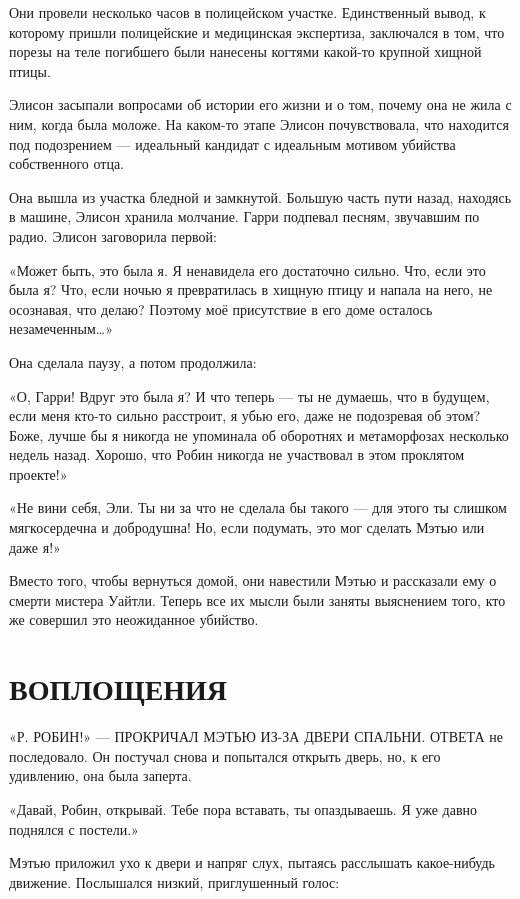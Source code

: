 \documentclass[a5paper, 9pt,
final, openany, twoside=true]{memoir}
\begin{document}
Они провели несколько часов в полицейском участке. Единственный вывод, к которому пришли полицейские и медицинская экспертиза, заключался в том, что порезы на теле погибшего были нанесены когтями какой-то крупной хищной птицы.

Элисон засыпали вопросами об истории его жизни и о том, почему она не жила с ним, когда была моложе. На каком-то этапе Элисон почувствовала, что находится под подозрением — идеальный кандидат с идеальным мотивом убийства собственного отца.\bigskip

Она вышла из участка бледной и замкнутой. Большую часть пути назад, находясь в машине, Элисон хранила молчание. Гарри подпевал песням, звучавшим по радио. Элисон заговорила первой:

«Может быть, это была я. Я ненавидела его достаточно сильно. Что, если это была я? Что, если ночью я превратилась в хищную птицу и напала на него, не осознавая, что делаю? Поэтому моё присутствие в его доме осталось незамеченным…»

Она сделала паузу, а потом продолжила:

«О, Гарри! Вдруг это была я? И что теперь — ты не думаешь, что в будущем, если меня кто-то сильно расстроит, я убью его, даже не подозревая об этом? Боже, лучше бы я никогда не упоминала об оборотнях и метаморфозах несколько недель назад. Хорошо, что Робин никогда не участвовал в этом проклятом проекте!»

«Не вини себя, Эли. Ты ни за что не сделала бы такого — для этого ты слишком мягкосердечна и добродушна! Но, если подумать, это мог сделать Мэтью или даже я!»

Вместо того, чтобы вернуться домой, они навестили Мэтью и рассказали ему о смерти мистера Уайтли. Теперь все их мысли были заняты выяснением того, кто же совершил это неожиданное убийство.

\chapter{ВОПЛОЩЕНИЯ}
«Р{. РОБИН!» — ПРОКРИЧАЛ МЭТЬЮ ИЗ-ЗА ДВЕРИ СПАЛЬНИ. ОТВЕТА} не последовало. Он постучал снова и попытался открыть дверь, но, к его удивлению, она была заперта.

«Давай, Робин, открывай. Тебе пора вставать, ты опаздываешь. Я уже давно поднялся с постели.»

Мэтью приложил ухо к двери и напряг слух, пытаясь расслышать какое-нибудь движение. Послышался низкий, приглушенный голос:
\end{document}
